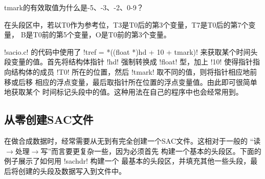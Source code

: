\begin{note}
tmark的有效取值为什么是-5、-3、-2、0-9？

在头段区中，若以T0作为参考位，T3是T0后的第3个变量，T7是T0后的第7个变量，
B是T0前的第5个变量，O是T0前的第3个变量。

!sacio.c! 的代码中使用了 !tref = *((float *)hd + 10 + tmark)!
来获取某个时间头段变量的值。首先将结构体指针 !hd! 强制转换成
!float! 型，加上 !10! 使得指针指向结构体的成员 !T0!
所在的位置，然后 !tmark! 取不同的值，则将指针相应地前移或后移
相应的浮点变量，最后取指针所在位置的浮点变量值。由此即可很简单地获取某个
时间标记头段中的值。这种用法在自己的程序中也会经常用到。
\end{note}

\subsection{从零创建SAC文件}
在做合成数据时，经常需要从无到有完全创建一个SAC文件。这相对于一般的
``读$\rightarrow$处理$\rightarrow$写''而言要更复杂一些，因为必须首先
构建一个基本的头段区。下面的例子展示了如何用 !sachdr! 构建一个
最基本的头段区，并填充其他一些头段，最后将创建的头段及数据写入到文件中。
\inputminted{C}{./sacio/writesac.c}
